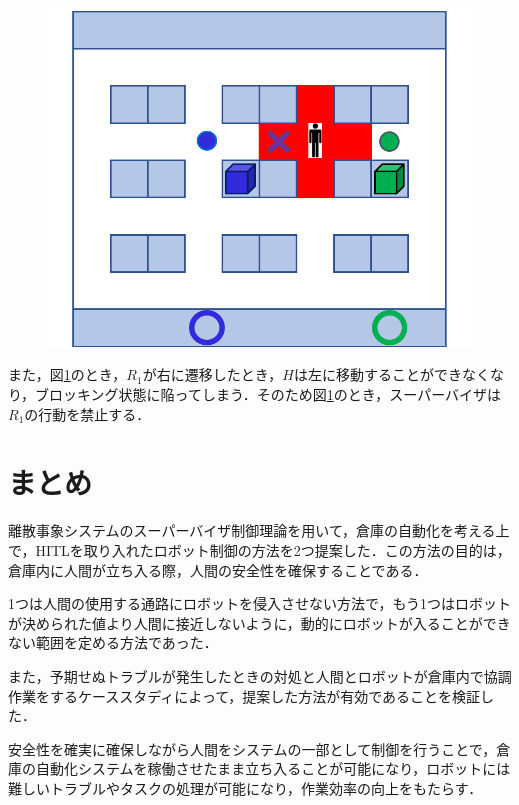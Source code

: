 \begin{figure}[htbp]
\begin{center}
\begin{tabular}{c}
    \end{tabular}
  \end{center}
\end{figure}

\begin{figure}[h]
    \centering
    \includegraphics[scale=0.2]{figures/case_Method2_3.pdf}
    \caption{}
    \label{fig:case_Method2_3}
\end{figure}


また，図\ref{fig:case_Method2_3}のとき，$R_1$が右に遷移したとき，$H$は左に移動することができなくなり，ブロッキング状態に陥ってしまう．そのため図\ref{fig:case_Method2_3}のとき，スーパーバイザは$R_1$の行動を禁止する．

\section{{まとめ}}
離散事象システムのスーパーバイザ制御理論を用いて，倉庫の自動化を考える上で，HITLを取り入れたロボット制御の方法を2つ提案した．この方法の目的は，倉庫内に人間が立ち入る際，人間の安全性を確保することである．

1つは人間の使用する通路にロボットを侵入させない方法で，もう1つはロボットが決められた値より人間に接近しないように，動的にロボットが入ることができない範囲を定める方法であった．

また，予期せぬトラブルが発生したときの対処と人間とロボットが倉庫内で協調作業をするケーススタディによって，提案した方法が有効であることを検証した．

安全性を確実に確保しながら人間をシステムの一部として制御を行うことで，倉庫の自動化システムを稼働させたまま立ち入ることが可能になり，ロボットには難しいトラブルやタスクの処理が可能になり，作業効率の向上をもたらす．